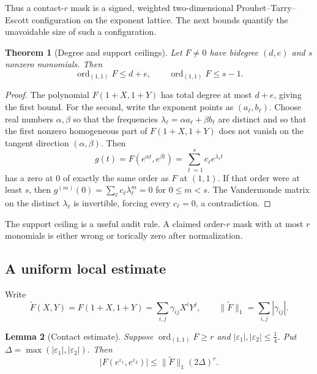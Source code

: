\documentclass[11pt,oneside]{article}
\newtheorem{theorem}{Theorem}[section]
\newtheorem{lemma}[theorem]{Lemma}
\theoremstyle{definition}
\theoremstyle{remark}
\newcommand{\ord}{\operatorname{ord}}
\begin{document}
Thus a contact-$r$ mask is a signed, weighted two-dimensional Prouhet--Tarry--Escott
configuration on the exponent lattice.  The next bounds quantify the unavoidable size of
such a configuration.

\begin{theorem}[Degree and support ceilings]
\label{thm:contact-ceilings}
Let $F\ne0$ have bidegree $(d,e)$ and $s$ nonzero monomials.  Then
\begin{equation}
 \ord_{(1,1)}F\le d+e,
 \qquad
 \ord_{(1,1)}F\le s-1.
 \label{eq:contact-ceilings}
\end{equation}
\end{theorem}

\begin{proof}
The polynomial $F(1+X,1+Y)$ has total degree at most $d+e$, giving the first bound.
For the second, write the exponent points as $(a_\ell,b_\ell)$.  Choose real numbers
$\alpha,\beta$ so that the frequencies
$\lambda_\ell=\alpha a_\ell+\beta b_\ell$ are distinct and so that the first nonzero
homogeneous part of $F(1+X,1+Y)$ does not vanish on the tangent direction
$(\alpha,\beta)$.  Then
\[
 g(t)=F(e^{\alpha t},e^{\beta t})
     =\sum_{\ell=1}^s c_\ell e^{\lambda_\ell t}
\]
has a zero at $0$ of exactly the same order as $F$ at $(1,1)$.  If that order were at least
$s$, then
$g^{(m)}(0)=\sum_\ell c_\ell\lambda_\ell^m=0$ for $0\le m<s$.  The Vandermonde matrix on the
distinct $\lambda_\ell$ is invertible, forcing every $c_\ell=0$, a contradiction.
\end{proof}

The support ceiling is a useful audit rule.  A claimed order-$r$ mask with at most $r$
monomials is either wrong or torically zero after normalization.

\subsection{A uniform local estimate}
\label{subsec:local-estimate}

Write
\begin{equation}
 \widetilde F(X,Y)=F(1+X,1+Y)=\sum_{i,j}\gamma_{ij}X^iY^j,
 \qquad
 \|\widetilde F\|_1=\sum_{i,j}|\gamma_{ij}|.
 \label{eq:shifted-mask}
\end{equation}

\begin{lemma}[Contact estimate]
\label{lem:contact-estimate}
Suppose $\ord_{(1,1)}F\ge r$ and
$|\varepsilon_1|,|\varepsilon_2|\le\tfrac14$.  Put
$\Delta=\max(|\varepsilon_1|,|\varepsilon_2|)$.  Then
\begin{equation}
 |F(e^{\varepsilon_1},e^{\varepsilon_2})|
 \le \|\widetilde F\|_1(2\Delta)^r.
 \label{eq:contact-estimate}
\end{equation}
\end{lemma}
\end{document}
